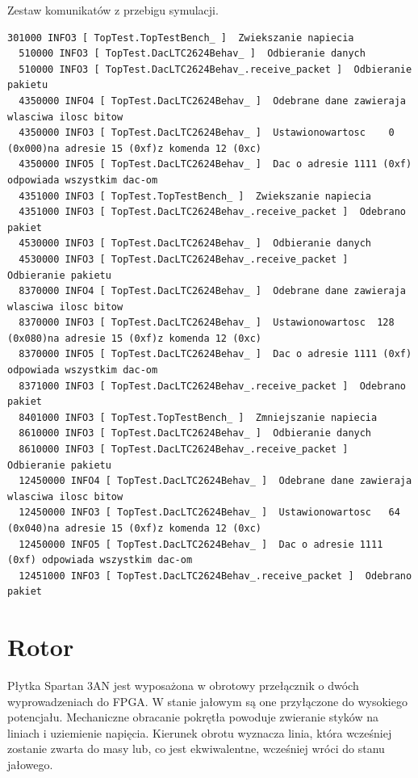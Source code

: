 \documentclass[a4paper,12pt]{article}
\begin{document}
Zestaw komunikatów z przebigu symulacji.
\begin{lstlisting}[label=dacout,caption=DAC logi]
  301000 INFO3 [ TopTest.TopTestBench_ ]  Zwiekszanie napiecia
  510000 INFO3 [ TopTest.DacLTC2624Behav_ ]  Odbieranie danych
  510000 INFO3 [ TopTest.DacLTC2624Behav_.receive_packet ]  Odbieranie pakietu
  4350000 INFO4 [ TopTest.DacLTC2624Behav_ ]  Odebrane dane zawieraja wlasciwa ilosc bitow
  4350000 INFO3 [ TopTest.DacLTC2624Behav_ ]  Ustawionowartosc    0 (0x000)na adresie 15 (0xf)z komenda 12 (0xc)
  4350000 INFO5 [ TopTest.DacLTC2624Behav_ ]  Dac o adresie 1111 (0xf) odpowiada wszystkim dac-om
  4351000 INFO3 [ TopTest.TopTestBench_ ]  Zwiekszanie napiecia
  4351000 INFO3 [ TopTest.DacLTC2624Behav_.receive_packet ]  Odebrano pakiet
  4530000 INFO3 [ TopTest.DacLTC2624Behav_ ]  Odbieranie danych
  4530000 INFO3 [ TopTest.DacLTC2624Behav_.receive_packet ]  Odbieranie pakietu
  8370000 INFO4 [ TopTest.DacLTC2624Behav_ ]  Odebrane dane zawieraja wlasciwa ilosc bitow
  8370000 INFO3 [ TopTest.DacLTC2624Behav_ ]  Ustawionowartosc  128 (0x080)na adresie 15 (0xf)z komenda 12 (0xc)
  8370000 INFO5 [ TopTest.DacLTC2624Behav_ ]  Dac o adresie 1111 (0xf) odpowiada wszystkim dac-om
  8371000 INFO3 [ TopTest.DacLTC2624Behav_.receive_packet ]  Odebrano pakiet
  8401000 INFO3 [ TopTest.TopTestBench_ ]  Zmniejszanie napiecia
  8610000 INFO3 [ TopTest.DacLTC2624Behav_ ]  Odbieranie danych
  8610000 INFO3 [ TopTest.DacLTC2624Behav_.receive_packet ]  Odbieranie pakietu
  12450000 INFO4 [ TopTest.DacLTC2624Behav_ ]  Odebrane dane zawieraja wlasciwa ilosc bitow
  12450000 INFO3 [ TopTest.DacLTC2624Behav_ ]  Ustawionowartosc   64 (0x040)na adresie 15 (0xf)z komenda 12 (0xc)
  12450000 INFO5 [ TopTest.DacLTC2624Behav_ ]  Dac o adresie 1111 (0xf) odpowiada wszystkim dac-om
  12451000 INFO3 [ TopTest.DacLTC2624Behav_.receive_packet ]  Odebrano pakiet
\end{lstlisting}


\newpage
\section{Rotor}

Płytka Spartan 3AN jest wyposażona w obrotowy przełącznik o dwóch wyprowadzeniach do FPGA. W stanie jałowym są one przyłączone do wysokiego potencjału. Mechaniczne obracanie pokrętła powoduje zwieranie styków na liniach i uziemienie napięcia. Kierunek obrotu wyznacza linia, która wcześniej zostanie zwarta do masy lub, co jest ekwiwalentne, wcześniej wróci do stanu jałowego.
\end{document}
